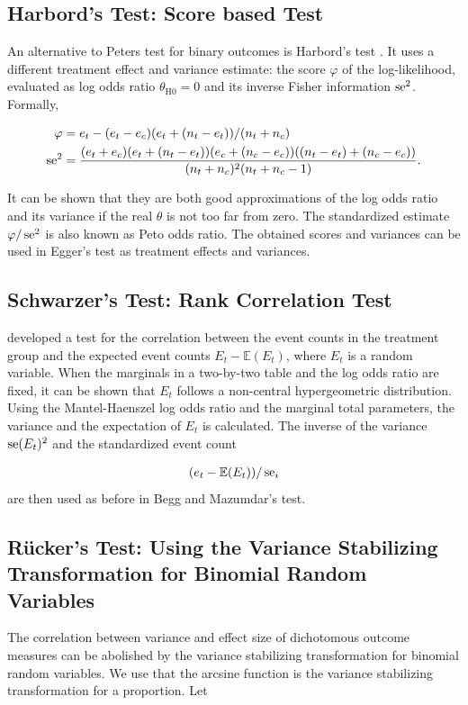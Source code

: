 \documentclass[11pt,a4paper,twoside]{book}\usepackage[]{graphicx}\usepackage[]{color}
\begin{document}
\subsection{Harbord's Test: Score based Test} \label{sec:Harbord}
An alternative to Peters test for binary outcomes is Harbord's test \citep{Harbord}.
It uses a different treatment effect and variance estimate: the score $\varphi$ of the log-likelihood, evaluated as log odds ratio $\theta_\textrm{H0} = 0$ and its inverse Fisher information $\operatorname{se}^2$. Formally,

\begin{align}
\varphi &= e_t - (e_t - e_c)(e_t + (n_t - e_t))/(n_t + n_c) \nonumber \\
 \operatorname{se}^2 &= \frac{(e_t + e_c)(e_t + (n_t - e_t))(e_c + (n_c - e_c))((n_t - e_t) + (n_c - e_c))}{(n_t + n_c)^2(n_t + n_c - 1)}. \nonumber
\end{align}

It can be shown that they are both good approximations of the log odds ratio and its variance if the real $\theta$ is not too far from zero. The standardized estimate $\varphi/\operatorname{se}^2$ is also known as Peto odds ratio. The obtained scores and variances can be used in Egger's test as treatment effects and variances.


\subsection{Schwarzer's Test: Rank Correlation Test} \label{sec:Schwarzer}
\citet{Schwarzer} developed a test for the correlation between the event counts in the treatment group and the expected event counts $E_t - \mathbb{E}(E_t)$, where $E_t$ is a random variable. When the marginals in a two-by-two table and the log odds ratio are fixed, it can be shown that $E_t$ follows a non-central hypergeometric distribution. Using the Mantel-Haenszel log odds ratio and the marginal total parameters, the variance and the expectation of $E_t$ is calculated. The inverse of the variance $\operatorname{se}(E_t)^2$ and the standardized event count

\begin{align}
(e_t - \mathbb{E}(E_t))/\operatorname{se}_i
\end{align}
are then used as before in Begg and Mazumdar's test.

\subsection{R\"ucker's Test: Using the Variance Stabilizing Transformation for Binomial Random Variables} \label{sec:Rucker}
The correlation between variance and effect size of dichotomous outcome measures can be abolished by the variance stabilizing transformation for binomial random variables. We use that the arcsine function is the variance stabilizing transformation for a proportion. Let
\end{document}
